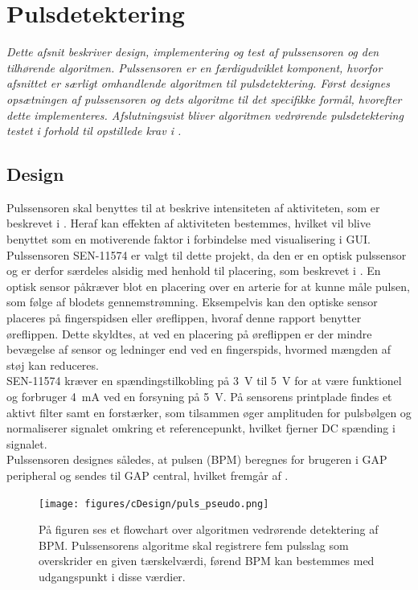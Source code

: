 \section{Pulsdetektering}\label{sec_de_im_te_puls}
\textit{Dette afsnit beskriver design, implementering og test af pulssensoren og den tilhørende algoritmen. Pulssensoren er en færdigudviklet komponent, hvorfor afsnittet er særligt omhandlende algoritmen til pulsdetektering. Først designes opsætningen af pulssensoren og dets algoritme til det specifikke formål, hvorefter dette implementeres. Afslutningsvist bliver algoritmen vedrørende pulsdetektering testet i forhold til opstillede krav i .}

\subsection{Design} \label{sec_design_puls}
Pulssensoren skal benyttes til at beskrive intensiteten af aktiviteten, som er beskrevet i . Heraf kan effekten af aktiviteten bestemmes, hvilket vil blive benyttet som en motiverende faktor i forbindelse med visualisering i GUI. \newline
Pulssensoren SEN-11574 er valgt til dette projekt, da den er en optisk pulssensor og er derfor særdeles alsidig med henhold til placering, som beskrevet i . En optisk sensor påkræver blot en placering over en arterie for at kunne måle pulsen, som følge af blodets gennemstrømning. Eksempelvis kan den optiske sensor placeres på fingerspidsen eller øreflippen, hvoraf denne rapport benytter øreflippen. Dette skyldtes, at ved en placering på øreflippen er der mindre bevægelse af sensor og ledninger end ved en fingerspids, hvormed mængden af støj kan reduceres. \\
SEN-11574 kræver en spændingstilkobling på 3~V til 5~V for at være funktionel og forbruger 4~mA ved en forsyning på 5~V. På sensorens printplade findes et aktivt filter samt en forstærker, som tilsammen øger amplituden for pulsbølgen og normaliserer signalet omkring et referencepunkt, hvilket fjerner DC spænding i signalet. \citep{Murphy2016,Murphy2016_sensor}\\
Pulssensoren designes således, at pulsen (BPM) beregnes for brugeren i GAP peripheral og sendes til GAP central, hvilket fremgår af .
\begin{figure}[H]
	\centering
	\texttt{[image: figures/cDesign/puls\_pseudo.png]}
	\caption{På figuren ses et flowchart over algoritmen vedrørende detektering af BPM. Pulssensorens algoritme skal registrere fem pulsslag som overskrider en given tærskelværdi, førend BPM kan bestemmes med udgangspunkt i disse værdier.}
	\label{fig:puls_pseudo}
\end{figure}
